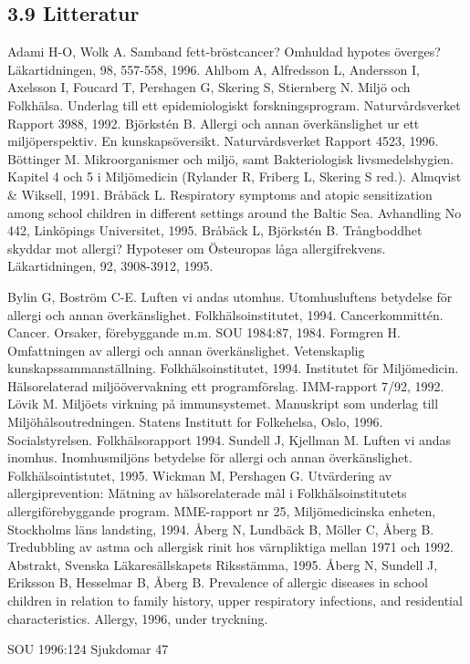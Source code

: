 \subsection*{3.9 Litteratur}
Adami H-O, Wolk A. Samband fett-bröstcancer? Omhuldad hypotes överges? Läkartidningen, 98, 557-558, 1996.
Ahlbom A, Alfredsson L, Andersson I, Axelsson I, Foucard T, Pershagen G, Skering S, Stiernberg N. Miljö och Folkhälsa. Underlag till ett epidemiologiskt forskningsprogram. Naturvårdsverket Rapport 3988, 1992.
Björkstén B. Allergi och annan överkänslighet ur ett miljöperspektiv. En kunskapsöversikt. Naturvårdsverket Rapport 4523, 1996.
Böttinger M. Mikroorganismer och miljö, samt Bakteriologisk livsmedelshygien. Kapitel 4 och 5 i Miljömedicin (Rylander R, Friberg L, Skering S red.). Almqvist \& Wiksell, 1991.
Bråbäck L. Respiratory symptoms and atopic sensitization among school children in different settings around the Baltic Sea. Avhandling No 442, Linköpings Universitet, 1995.
Bråbäck L, Björkstén B. Trångboddhet skyddar mot allergi? Hypoteser om Östeuropas låga allergifrekvens. Läkartidningen, 92, 3908-3912, 1995.

Bylin G, Boström C-E. Luften vi andas utomhus. Utomhusluftens betydelse för allergi och annan överkänslighet. Folkhälsoinstitutet, 1994.
Cancerkommittén. Cancer. Orsaker, förebyggande m.m. SOU 1984:87, 1984.
Formgren H. Omfattningen av allergi och annan överkänslighet. Vetenskaplig kunskapssammanställning. Folkhälsoinstitutet, 1994.
Institutet för Miljömedicin. Hälsorelaterad miljöövervakning ett programförslag. IMM-rapport 7/92, 1992.
Lövik M. Miljöets virkning på immunsystemet. Manuskript som underlag till Miljöhålsoutredningen. Statens Institutt for Folkehelsa, Oslo, 1996.
Socialstyrelsen. Folkhälsorapport 1994.
Sundell J, Kjellman M. Luften vi andas inomhus. Inomhusmiljöns betydelse för allergi och annan överkänslighet. Folkhälsointistutet, 1995.
Wickman M, Pershagen G. Utvärdering av allergiprevention: Mätning av hälsorelaterade mål i Folkhälsoinstitutets allergiförebyggande program. MME-rapport nr 25, Miljömedicinska enheten, Stockholms läns landsting, 1994.
Åberg N, Lundbäck B, Möller C, Åberg B. Tredubbling av astma och allergisk rinit hos värnpliktiga mellan 1971 och 1992. Abstrakt, Svenska Läkaresällskapets Riksstämma, 1995.
Åberg N, Sundell J, Eriksson B, Hesselmar B, Åberg B. Prevalence of allergic diseases in school children in relation to family history, upper respiratory infections, and residential characteristics. Allergy, 1996, under tryckning.

SOU 1996:124
Sjukdomar 47

